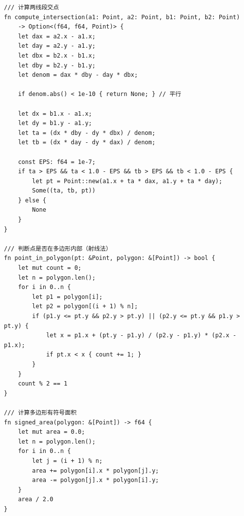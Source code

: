\documentclass[12pt,a4paper]{article}
\begin{document}
\begin{lstlisting}
/// 计算两线段交点
fn compute_intersection(a1: Point, a2: Point, b1: Point, b2: Point) 
    -> Option<(f64, f64, Point)> {
    let dax = a2.x - a1.x;
    let day = a2.y - a1.y;
    let dbx = b2.x - b1.x;
    let dby = b2.y - b1.y;
    let denom = dax * dby - day * dbx;
    
    if denom.abs() < 1e-10 { return None; } // 平行
    
    let dx = b1.x - a1.x;
    let dy = b1.y - a1.y;
    let ta = (dx * dby - dy * dbx) / denom;
    let tb = (dx * day - dy * dax) / denom;
    
    const EPS: f64 = 1e-7;
    if ta > EPS && ta < 1.0 - EPS && tb > EPS && tb < 1.0 - EPS {
        let pt = Point::new(a1.x + ta * dax, a1.y + ta * day);
        Some((ta, tb, pt))
    } else {
        None
    }
}

/// 判断点是否在多边形内部（射线法）
fn point_in_polygon(pt: &Point, polygon: &[Point]) -> bool {
    let mut count = 0;
    let n = polygon.len();
    for i in 0..n {
        let p1 = polygon[i];
        let p2 = polygon[(i + 1) % n];
        if (p1.y <= pt.y && p2.y > pt.y) || (p2.y <= pt.y && p1.y > pt.y) {
            let x = p1.x + (pt.y - p1.y) / (p2.y - p1.y) * (p2.x - p1.x);
            if pt.x < x { count += 1; }
        }
    }
    count % 2 == 1
}

/// 计算多边形有符号面积
fn signed_area(polygon: &[Point]) -> f64 {
    let mut area = 0.0;
    let n = polygon.len();
    for i in 0..n {
        let j = (i + 1) % n;
        area += polygon[i].x * polygon[j].y;
        area -= polygon[j].x * polygon[i].y;
    }
    area / 2.0
}
\end{lstlisting}
\end{document}
